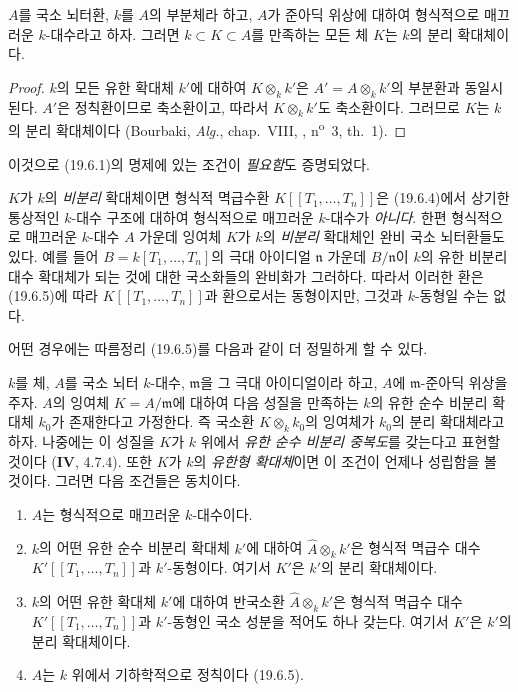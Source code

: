 
\begin{corollary}[19.6.5.1]
\label{0.19.6.5.1-ko}
$A$를 국소 뇌터환, $k$를 $A$의 부분체라 하고, $A$가 준아딕 위상에
대하여 형식적으로 매끄러운 $k$-대수라고 하자. 그러면
$k\subset K\subset A$를 만족하는 모든 체 $K$는 $k$의 분리
확대체이다.
\end{corollary}

\begin{proof}
$k$의 모든 유한 확대체 $k'$에 대하여 $K\otimes_k k'$은
$A'=A\otimes_k k'$의 부분환과 동일시된다. $A'$은 정칙환이므로
축소환이고, 따라서 $K\otimes_k k'$도 축소환이다. 그러므로 $K$는
$k$의 분리 확대체이다 (Bourbaki, \emph{Alg.}, chap.~VIII,
, n\textsuperscript{o}~3, th.~1).
\end{proof}

이것으로 (19.6.1)의 명제에 있는 조건이 \emph{필요함}도 증명되었다.

\begin{remark}[19.6.5.2]
\label{0.19.6.5.2-ko}
$K$가 $k$의 \emph{비분리} 확대체이면 형식적 멱급수환
$K[[T_1,\ldots,T_n]]$은 (19.6.4)에서 상기한 통상적인 $k$-대수
구조에 대하여 형식적으로 매끄러운 $k$-대수가 \emph{아니다}. 한편
형식적으로 매끄러운 $k$-대수 $A$ 가운데 잉여체 $K$가 $k$의
\emph{비분리} 확대체인 완비 국소 뇌터환들도 있다. 예를 들어
$B=k[T_1,\ldots,T_n]$의 극대 아이디얼 $\mathfrak n$ 가운데
$B/\mathfrak n$이 $k$의 유한 비분리 대수 확대체가 되는 것에 대한
국소화들의 완비화가 그러하다. 따라서 이러한 환은 (19.6.5)에 따라
$K[[T_1,\ldots,T_n]]$과 환으로서는 동형이지만, 그것과 $k$-동형일
수는 없다.

어떤 경우에는 따름정리 (19.6.5)를 다음과 같이 더 정밀하게 할 수
있다.
\end{remark}

\begin{proposition}[19.6.6]
\label{0.19.6.6-ko}
$k$를 체, $A$를 국소 뇌터 $k$-대수, $\mathfrak m$을 그 극대
아이디얼이라 하고, $A$에 $\mathfrak m$-준아딕 위상을 주자. $A$의
잉여체 $K=A/\mathfrak m$에 대하여 다음 성질을 만족하는 $k$의 유한
순수 비분리 확대체 $k_0$가 존재한다고 가정한다. 즉 국소환
$K\otimes_k k_0$의 잉여체가 $k_0$의 분리 확대체라고 하자. 나중에는
이 성질을 $K$가 $k$ 위에서 \emph{유한 순수 비분리 중복도}를 갖는다고
표현할 것이다 ($\mathbf{IV}$, 4.7.4). 또한 $K$가 $k$의 \emph{유한형
확대체}이면 이 조건이 언제나 성립함을 볼 것이다. 그러면 다음
조건들은 동치이다.
\begin{enumerate}
  \item[a)] $A$는 형식적으로 매끄러운 $k$-대수이다.
  \item[b)] $k$의 어떤 유한 순수 비분리 확대체 $k'$에 대하여
  $\widehat A\otimes_k k'$은 형식적 멱급수 대수
  $K'[[T_1,\ldots,T_n]]$과 $k'$-동형이다. 여기서 $K'$은 $k'$의 분리
  확대체이다.
  \item[b')] $k$의 어떤 유한 확대체 $k'$에 대하여 반국소환
  $\widehat A\otimes_k k'$은 형식적 멱급수 대수
  $K'[[T_1,\ldots,T_n]]$과 $k'$-동형인 국소 성분을 적어도 하나
  갖는다. 여기서 $K'$은 $k'$의 분리 확대체이다.
  \item[c)] $A$는 $k$ 위에서 기하학적으로 정칙이다 (19.6.5).
\end{enumerate}
\end{proposition}

